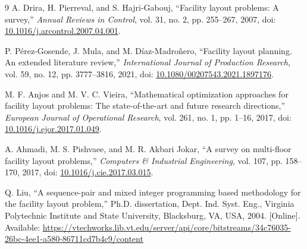 \documentclass[UTF8,zihao=5,a4paper,fontset=fandol]{ctexart}
\begin{document}
\begin{thebibliography}{9}
A. Drira, H. Pierreval, and S. Hajri-Gabouj,
``Facility layout problems: A survey,''
\textit{Annual Reviews in Control}, vol. 31, no. 2, pp. 255--267, 2007,
doi: \href{https://doi.org/10.1016/j.arcontrol.2007.04.001}{10.1016/j.arcontrol.2007.04.001}.

P. P\'{e}rez-Gosende, J. Mula, and M. D\'{i}az-Madro\~nero,
``Facility layout planning. An extended literature review,''
\textit{International Journal of Production Research}, vol. 59, no. 12,
pp. 3777--3816, 2021,
doi: \href{https://doi.org/10.1080/00207543.2021.1897176}{10.1080/00207543.2021.1897176}.

M. F. Anjos and M. V. C. Vieira,
``Mathematical optimization approaches for facility layout problems:
The state-of-the-art and future research directions,''
\textit{European Journal of Operational Research}, vol. 261, no. 1,
pp. 1--16, 2017,
doi: \href{https://doi.org/10.1016/j.ejor.2017.01.049}{10.1016/j.ejor.2017.01.049}.

A. Ahmadi, M. S. Pishvaee, and M. R. Akbari Jokar,
``A survey on multi-floor facility layout problems,''
\textit{Computers \& Industrial Engineering}, vol. 107, pp. 158--170, 2017,
doi: \href{https://doi.org/10.1016/j.cie.2017.03.015}{10.1016/j.cie.2017.03.015}.

Q. Liu, ``A sequence-pair and mixed integer programming based methodology
for the facility layout problem,'' Ph.D. dissertation, Dept. Ind. Syst. Eng.,
Virginia Polytechnic Institute and State University, Blacksburg, VA, USA, 2004.
[Online]. Available:
\url{https://vtechworks.lib.vt.edu/server/api/core/bitstreams/34c76035-26bc-4ee1-a580-86711cd7b4c9/content}
\end{thebibliography}
\end{document}

